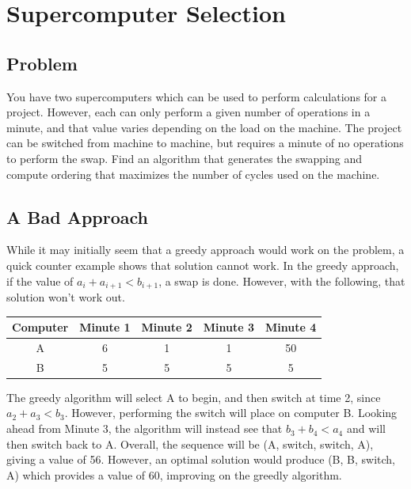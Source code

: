 \documentclass[titlepage]{article}
\numberwithin{equation}{subsection}
\begin{document}
\section{Supercomputer Selection}
\subsection{Problem}
You have two supercomputers which can be used to perform calculations for a project. However, each can only perform
a given number of operations in a minute, and that value varies depending on the load on the machine. The project can
be switched from machine to machine, but requires a minute of no operations to perform the swap. Find an algorithm
that generates the swapping and compute ordering that maximizes the number of cycles used on the machine.
\subsection{A Bad Approach}
While it may initially seem that a greedy approach would work on the problem, a quick counter example shows that
solution cannot work. In the greedy approach, if the value of $a_i + a_{i+1} < b_{i+1}$, a swap is done. However,
with the following, that solution won't work out. 
\begin{center}
  \begin{tabular}{|c|c|c|c|c|}
    \hline
  Computer & Minute 1 & Minute 2 & Minute 3 & Minute 4\\ \hline
  A & 6 & 1 & 1 & 50 \\
  B & 5 & 5 & 5 & 5  \\
  \hline
  \end{tabular}
\end{center}
The greedy algorithm will select A to begin, and then switch at time 2, since $a_2 + a_3 < b_3$. However, performing
the switch will place on computer B. Looking ahead from Minute 3, the algorithm will instead see that $b_3 + b_4 < a_4$
and will then switch back to A. Overall, the sequence will be (A, switch, switch, A), giving a value of 56. However,
an optimal solution would produce (B, B, switch, A) which provides a value of 60, improving on the greedly algorithm.
\end{document}

